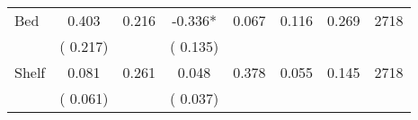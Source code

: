 \begin{tabular}{l*{7}{c}}
 Bed       &              0.403       &        0.216  &             -0.336*       &        0.067  &              0.116       &              0.269 &  2718 \\ 
                       &       (       0.217)             &                               &       (       0.135)                     &                               &                                               &                                &                      \\ 

 Shelf       &              0.081       &        0.261  &              0.048       &        0.378  &              0.055       &              0.145 &  2718 \\ 
                       &       (       0.061)             &                               &       (       0.037)                     &                               &                                               &                                &                      \\ 

\hline \end{tabular}